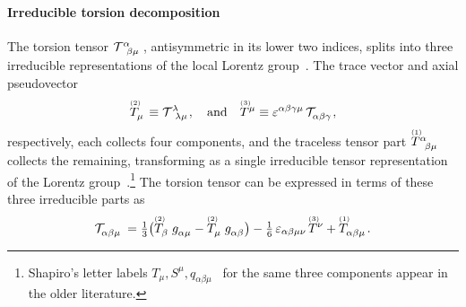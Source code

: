 \paragraph*{Irreducible torsion decomposition}
\label{IrreducibleTorsionFull}
The torsion tensor $\MAGT{^\alpha_{\beta\mu}}$, antisymmetric in
its lower two indices, splits into three irreducible
representations of the local Lorentz
group~\cite{hehl1976spin,hehl1995metric,shapiro2002torsion,obukhov2024electrodynamics}.
The trace vector and axial pseudovector
\begin{equation}
  \T[2]{_\mu} \equiv \MAGT{^\lambda_\lambda_\mu}\!,
  \qand
  \T[3]{^\mu} \equiv \varepsilon^{\alpha\beta\gamma\mu}\,
    \MAGT{_{\alpha\beta\gamma}}\!,
  \label{TraceAxialVector}
\end{equation}
respectively, each collects four components, and the traceless tensor part
$\T[1]{^\alpha_{\beta\mu}}$ collects the remaining,
transforming as a single irreducible tensor
representation of the Lorentz group~\cite{hehl1976spin}.\footnote{Shapiro's
letter labels $T_\mu, S^\mu, q_{\alpha\beta\mu}$~\cite{shapiro2002torsion}
for the same three components appear in the older literature.}
The torsion tensor can be expressed in terms of these three irreducible parts as
\begin{align}
  \MAGT{_{\alpha\beta\mu}}
    = \tfrac{1}{3}\bigl(\T[2]{_\beta}\,\g{_{\alpha\mu}}
                       - \T[2]{_\mu}\,\g{_{\alpha\beta}}\bigr)
    - \tfrac{1}{6}\,\varepsilon_{\alpha\beta\mu\nu}\,\T[3]{^\nu}
    + \T[1]{_{\alpha\beta\mu}}.
  \label{IrreducibleTorsion}
\end{align}

